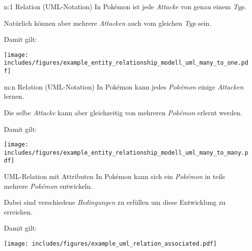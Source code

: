 \begin{example}{n:1 Relation (UML-Notation)}
    In Pokémon ist jede \emph{Attacke} von genau einem \emph{Typ}.

    Natürlich können aber mehrere \emph{Attacken} auch vom gleichen \emph{Typ} sein.

    Damit gilt:
    \begin{center}
        \texttt{[image: includes/figures/example\_entity\_relationship\_modell\_uml\_many\_to\_one.pdf]}
    \end{center}
\end{example}

\begin{example}{m:n Relation (UML-Notation)}
    In Pokémon kann jedes \emph{Pokémon} einige \emph{Attacken} lernen.

    Die selbe \emph{Attacke} kann aber gleichzeitig von mehreren \emph{Pokémon} erlernt werden.

    Damit gilt:
    \begin{center}
        \texttt{[image: includes/figures/example\_entity\_relationship\_modell\_uml\_many\_to\_many.pdf]}
    \end{center}
\end{example}

\begin{example}{UML-Relation mit Attributen}
    In Pokémon kann sich ein \emph{Pokémon} in teils mehrere \emph{Pokémon} entwickeln.

    Dabei sind verschiedene \emph{Bedingungen} zu erfüllen um diese Entwicklung zu erreichen.

    Damit gilt:
    \begin{center}
        \texttt{[image: includes/figures/example\_uml\_relation\_associated.pdf]}
    \end{center}
\end{example}

